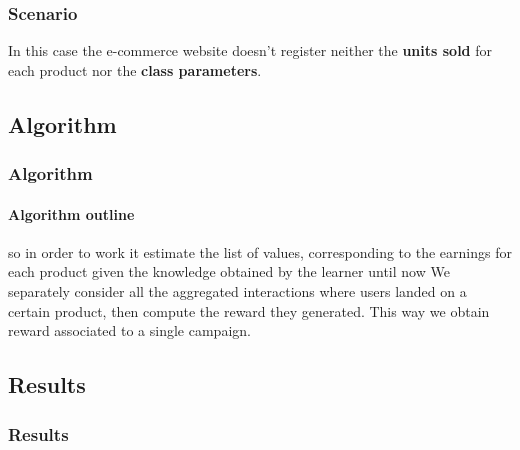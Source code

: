 \documentclass[11pt]{beamer}
\begin{document}

\begin{frame}

\frametitle{Scenario}

In this case the e-commerce website doesn't register neither the \textbf{units sold} for each product nor the \textbf{class parameters}.


\end{frame}


\subsection{Algorithm}


\begin{frame}

\frametitle{Algorithm}
\framesubtitle{Algorithm outline}

so in order to work it estimate the list of values, corresponding to the earnings for each product given the knowledge obtained by the learner until now
We separately consider all the aggregated interactions where users landed on a certain product, then compute the reward they generated.
This way we obtain reward associated to a single campaign.


\end{frame}


\subsection{Results}


\begin{frame}

\frametitle{Results}
\framesubtitle{}


\end{frame}







\end{document}

